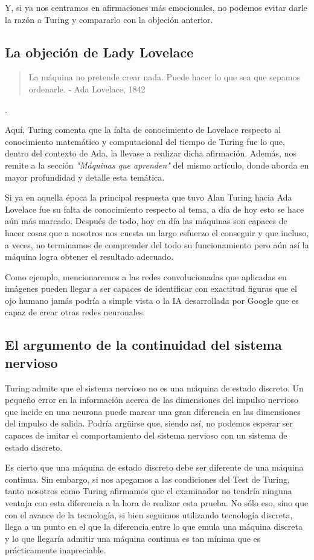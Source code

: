 \documentclass[12pt,a4paper]{article}
\begin{document}
Y, si ya nos centramos en afirmaciones más emocionales, no podemos evitar darle la razón a Turing y compararlo con la objeción anterior.

\subsection{La objeción de Lady Lovelace}
\begin{quote}\small La máquina no pretende crear nada. Puede hacer lo que sea que sepamos ordenarle. - Ada Lovelace, 1842\end{quote}.

Aquí, Turing comenta que la falta de conocimiento de Lovelace respecto al conocimiento matemático y computacional del tiempo de Turing fue lo que, dentro del contexto de Ada, la llevase a realizar dicha afirmación. Además, nos remite a la sección \emph{"Máquinas que aprenden"} del mismo artículo, donde aborda en mayor profundidad y detalle esta temática.

Si ya en aquella época la principal respuesta que tuvo Alan Turing hacia Ada Lovelace fue su falta de conocimiento respecto al tema, a día de hoy esto se hace aún más marcado. Después de todo, hoy en día las máquinas son capaces de hacer cosas que a nosotros nos cuesta un largo esfuerzo el conseguir y que incluso, a veces, no terminamos de comprender del todo su funcionamiento pero aún así la máquina logra obtener el resultado adecuado.

Como ejemplo, mencionaremos a las redes convolucionadas que aplicadas en imágenes pueden llegar a ser capaces de identificar con exactitud figuras que el ojo humano jamás podría a simple vista o la IA desarrollada por Google que es capaz de crear otras redes neuronales.

\subsection{El argumento de la continuidad del sistema nervioso}
Turing admite que el sistema nervioso no es una máquina de estado discreto. Un pequeño error en la información acerca de las dimensiones del impulso nervioso que incide en una neurona puede marcar una gran diferencia en las dimensiones del impulso de salida. Podría argüirse que, siendo así, no podemos esperar ser capaces de imitar el comportamiento del sistema nervioso con un sistema de estado discreto.

Es cierto que una máquina de estado discreto debe ser diferente de una máquina continua. Sin embargo, si nos apegamos a las condiciones del Test de Turing, tanto nosotros como Turing afirmamos que el examinador no tendría ninguna ventaja con esta diferencia a la hora de realizar esta prueba. No sólo eso, sino que con el avance de la tecnología, si bien seguimos utilizando tecnología discreta, llega a un punto en el que la diferencia entre lo que emula una máquina discreta y lo que llegaría admitir una máquina continua es tan mínima que es prácticamente inapreciable.
\end{document}
